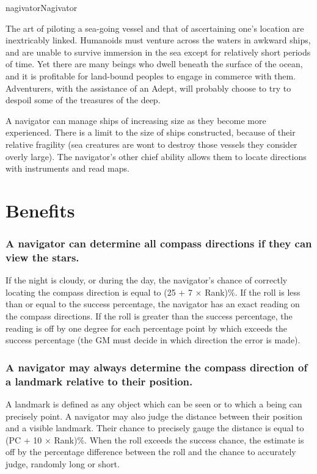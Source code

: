 \begin{Skill}[1.1]{nagivator}{Nagivator}

The art of piloting a sea-going vessel and that of ascertaining one’s
location are inextricably linked.  Humanoids must venture across the
waters in awkward ships, and are unable to survive immersion in the
sea except for relatively short periods of time. Yet there are many
beings who dwell beneath the surface of the ocean, and it is
profitable for land-bound peoples to engage in commerce with
them. Adventurers, with the assistance of an Adept, will probably
choose to try to despoil some of the treasures of the deep.

A navigator can manage ships of increasing size as they become more
experienced. There is a limit to the size of ships constructed,
because of their relative fragility (sea creatures are wont to destroy
those vessels they consider overly large).  The navigator’s other
chief ability allows them to locate directions with instruments and
read maps.

\section{Benefits}

\subsubsection{A navigator can determine all compass directions if they can view the stars.}

If the night is cloudy, or during the day, the navigator’s chance of
correctly locating the compass direction is equal to (25 + 7 ×
Rank)\%.  If the roll is less than or equal to the success percentage,
the navigator has an exact reading on the compass directions.  If the
roll is greater than the success percentage, the reading is off by one
degree for each percentage point by which exceeds the success
percentage (the GM must decide in which direction the error is made).

\subsubsection{A navigator may always determine the compass direction of a landmark
relative to their position.}

A landmark is defined as any object which can be seen or to which a
being can precisely point.  A navigator may also judge the distance
between their position and a visible landmark. Their chance to
precisely gauge the distance is equal to (PC + 10 × Rank)\%.  When the
roll exceeds the success chance, the estimate is off by the percentage
difference between the roll and the chance to accurately judge,
randomly long or short.


\end{Skill}
